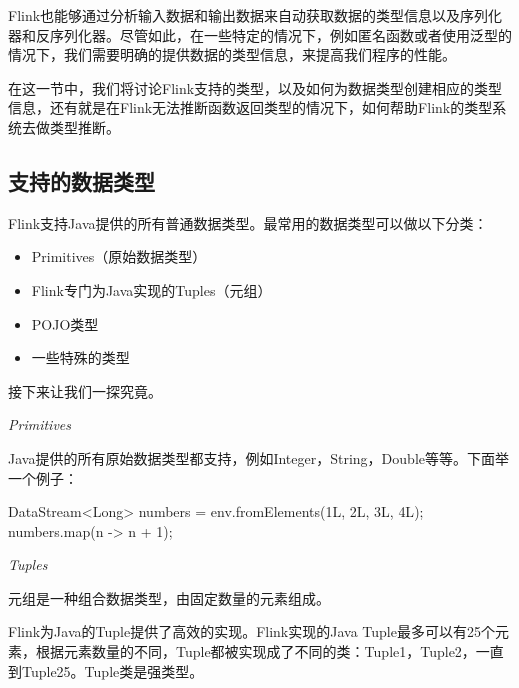 \documentclass[cn,11pt,chinese]{elegantbook}
\newenvironment{Shaded}{}{}
\newcommand{\BuiltInTok}[1]{#1}
\newcommand{\DecValTok}[1]{\textcolor[rgb]{0.25,0.63,0.44}{#1}}
\newcommand{\FunctionTok}[1]{\textcolor[rgb]{0.02,0.16,0.49}{#1}}
\newcommand{\NormalTok}[1]{#1}
\providecommand{\tightlist}{%
  \setlength{\itemsep}{0pt}\setlength{\parskip}{0pt}}
\begin{document}
Flink也能够通过分析输入数据和输出数据来自动获取数据的类型信息以及序列化器和反序列化器。尽管如此，在一些特定的情况下，例如匿名函数或者使用泛型的情况下，我们需要明确的提供数据的类型信息，来提高我们程序的性能。

在这一节中，我们将讨论Flink支持的类型，以及如何为数据类型创建相应的类型信息，还有就是在Flink无法推断函数返回类型的情况下，如何帮助Flink的类型系统去做类型推断。

\hypertarget{ux652fux6301ux7684ux6570ux636eux7c7bux578b}{%
\subsection{支持的数据类型}\label{ux652fux6301ux7684ux6570ux636eux7c7bux578b}}

Flink支持Java提供的所有普通数据类型。最常用的数据类型可以做以下分类：

\begin{itemize}
\tightlist
\item
  Primitives（原始数据类型）
\item
  Flink专门为Java实现的Tuples（元组）
\item
  POJO类型
\item
  一些特殊的类型
\end{itemize}

接下来让我们一探究竟。

\emph{Primitives}

Java提供的所有原始数据类型都支持，例如Integer，String，Double等等。下面举一个例子：

\begin{Shaded}
\begin{Highlighting}[]
\NormalTok{DataStream\textless{}}\BuiltInTok{Long}\NormalTok{\textgreater{} numbers = env.}\FunctionTok{fromElements}\NormalTok{(}\DecValTok{1L}\NormalTok{, }\DecValTok{2L}\NormalTok{, }\DecValTok{3L}\NormalTok{, }\DecValTok{4L}\NormalTok{);}
\NormalTok{numbers.}\FunctionTok{map}\NormalTok{(n {-}\textgreater{} n + }\DecValTok{1}\NormalTok{);}
\end{Highlighting}
\end{Shaded}

\emph{Tuples}

元组是一种组合数据类型，由固定数量的元素组成。

Flink为Java的Tuple提供了高效的实现。Flink实现的Java
Tuple最多可以有25个元素，根据元素数量的不同，Tuple都被实现成了不同的类：Tuple1，Tuple2，一直到Tuple25。Tuple类是强类型。
\end{document}
